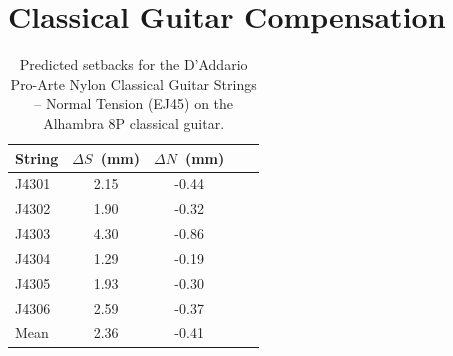%
%
%

 \section{Classical Guitar Compensation\label{sct:comp}}

 \begin{table}[htbp]
  \centering
  \caption{\label{tbl:ej45_setbacks} Predicted setbacks for the D'Addario Pro-Arte Nylon Classical Guitar Strings -- Normal Tension (EJ45) on the Alhambra 8P classical guitar.}
    \begin{tabular}{lcccc}
    \hline \hline
    String  & $\Delta S$~(mm) & $\Delta N$~(mm) \\
    \hline
    J4301 & 2.15 & -0.44 \\
    J4302 & 1.90 & -0.32 \\
    J4303 & 4.30 & -0.86 \\
    J4304 & 1.29 & -0.19 \\
    J4305 & 1.93 & -0.30 \\
    J4306 & 2.59 & -0.37 \\
    \hline \hline
    Mean & 2.36 & -0.41 \\
    \hline
    \end{tabular}%
 \end{table}%

